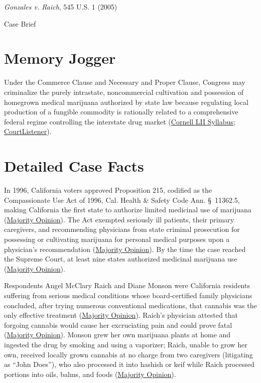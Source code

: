 \documentclass[12pt]{article}
\begin{document}
\begin{center}
{\LARGE \textit{Gonzales v. Raich}, 545 U.S. 1 (2005)\par}
\vspace{0.8em}
{\large Case Brief\par}
\end{center}
\vspace{1em}

\section{Memory Jogger}

Under the Commerce Clause and Necessary and Proper Clause, Congress may criminalize the purely intrastate, noncommercial cultivation and possession of homegrown medical marijuana authorized by state law because regulating local production of a fungible commodity is rationally related to a comprehensive federal regime controlling the interstate drug market (\href{https://www.law.cornell.edu/supct/html/03-1454.ZS.html}{Cornell LII Syllabus}; \href{https://www.courtlistener.com/opinion/799995/gonzales-v-raich/}{CourtListener}).

\section{Detailed Case Facts}

In 1996, California voters approved Proposition 215, codified as the Compassionate Use Act of 1996, Cal. Health \& Safety Code Ann. \S\ 11362.5, making California the first state to authorize limited medicinal use of marijuana (\href{https://www.law.cornell.edu/supct/html/03-1454.ZO.html}{Majority Opinion}). The Act exempted seriously ill patients, their primary caregivers, and recommending physicians from state criminal prosecution for possessing or cultivating marijuana for personal medical purposes upon a physician's recommendation (\href{https://www.law.cornell.edu/supct/html/03-1454.ZO.html}{Majority Opinion}). By the time the case reached the Supreme Court, at least nine states authorized medicinal marijuana use (\href{https://www.law.cornell.edu/supct/html/03-1454.ZO.html}{Majority Opinion}).

Respondents Angel McClary Raich and Diane Monson were California residents suffering from serious medical conditions whose board-certified family physicians concluded, after trying numerous conventional medications, that cannabis was the only effective treatment (\href{https://www.law.cornell.edu/supct/html/03-1454.ZO.html}{Majority Opinion}). Raich's physician attested that forgoing cannabis would cause her excruciating pain and could prove fatal (\href{https://www.law.cornell.edu/supct/html/03-1454.ZO.html}{Majority Opinion}). Monson grew her own marijuana plants at home and ingested the drug by smoking and using a vaporizer; Raich, unable to grow her own, received locally grown cannabis at no charge from two caregivers (litigating as ``John Does''), who also processed it into hashish or keif while Raich processed portions into oils, balms, and foods (\href{https://www.law.cornell.edu/supct/html/03-1454.ZO.html}{Majority Opinion}).
\end{document}
